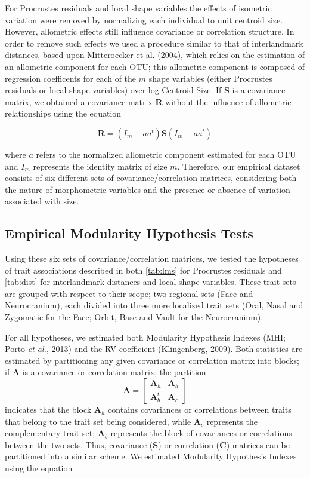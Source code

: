 \documentclass[12pt,twoside]{report}
\begin{document}
For Procrustes residuals and local shape variables the effects of
isometric variation were removed by normalizing each individual to unit
centroid size. However, allometric effects still influence covariance or
correlation structure. In order to remove such effects we used a
procedure similar to that of interlandmark distances, based upon
Mitteroecker et al. (2004), which relies on the estimation of an
allometric component for each OTU; this allometric component is composed
of regression coefficents for each of the $m$ shape variables (either
Procrustes residuals or local shape variables) over log Centroid Size.
If $\mathbf{S}$ is a covariance matrix, we obtained a covariance matrix
$\mathbf{R}$ without the influence of allometric relationships using the
equation

\begin{equation}
\mathbf{R} = (I_m - aa^t) \mathbf{S} (I_m - aa^t)
\label{eq:allo}
\end{equation}

where $a$ refers to the normalized allometric component estimated for
each OTU and $I_m$ represents the identity matrix of size $m$.
Therefore, our empirical dataset consists of six different sets of
covariance/correlation matrices, considering both the nature of
morphometric variables and the presence or absence of variation
associated with size.

\subsection{Empirical Modularity Hypothesis
Tests}\label{empirical-modularity-hypothesis-tests}

Using these six sets of covariance/correlation matrices, we tested the
hypotheses of trait associations described in both \autoref{tab:lms} for
Procrustes residuals and \autoref{tab:dist} for interlandmark distances
and local shape variables. These trait sets are grouped with respect to
their scope; two regional sets (Face and Neurocranium), each divided
into three more localized trait sets (Oral, Nasal and Zygomatic for the
Face; Orbit, Base and Vault for the Neurocranium).

For all hypotheses, we estimated both Modularity Hypothesis Indexes
(MHI; Porto \emph{et al.}, 2013) and the RV coefficient (Klingenberg,
2009). Both statistics are estimated by partitioning any given
covariance or correlation matrix into blocks; if $\mathbf{A}$ is a
covariance or correlation matrix, the partition \[
\mathbf{A} =
\begin{bmatrix}
\mathbf{A}_h & \mathbf{A}_b \\
\mathbf{A}^t_b & \mathbf{A}_c
\end{bmatrix}
\] indicates that the block $\mathbf{A}_h$ contains covariances or
correlations between traits that belong to the trait set being
considered, while $\mathbf{A}_c$ represents the complementary trait set;
$\mathbf{A}_b$ represents the block of covariances or correlations
between the two sets. Thus, covariance ($\mathbf{S}$) or correlation
($\mathbf{C}$) matrices can be partitioned into a similar scheme. We
estimated Modularity Hypothesis Indexes using the equation
\end{document}
